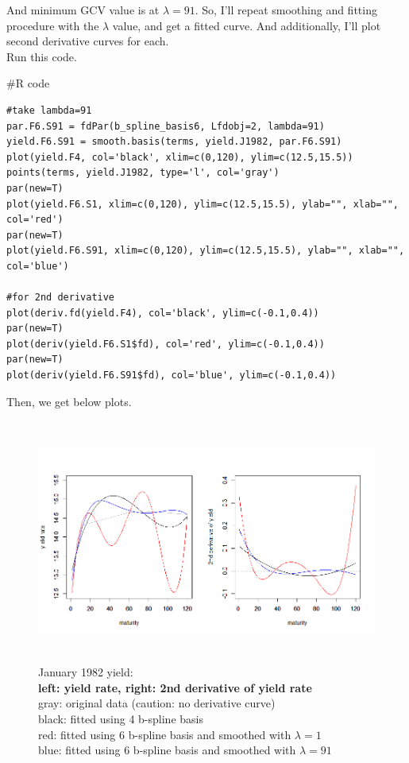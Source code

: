 \documentclass{article}
\newenvironment{Rcode}%
{%
    \begin{mdframed}
    \#R code
    \begin{small}
}
{%
    \end{small}
    \end{mdframed}
}
\begin{document}
And minimum GCV value is at $\lambda=91$. So, I'll repeat smoothing and fitting procedure with the $\lambda$ value,
and get a fitted curve. And additionally, I'll plot second derivative curves for each. \\Run this code.
\begin{Rcode}
    \begin{verbatim}
#take lambda=91
par.F6.S91 = fdPar(b_spline_basis6, Lfdobj=2, lambda=91)
yield.F6.S91 = smooth.basis(terms, yield.J1982, par.F6.S91)
plot(yield.F4, col='black', xlim=c(0,120), ylim=c(12.5,15.5))
points(terms, yield.J1982, type='l', col='gray')
par(new=T)
plot(yield.F6.S1, xlim=c(0,120), ylim=c(12.5,15.5), ylab="", xlab="", col='red')
par(new=T)
plot(yield.F6.S91, xlim=c(0,120), ylim=c(12.5,15.5), ylab="", xlab="", col='blue')

#for 2nd derivative
plot(deriv.fd(yield.F4), col='black', ylim=c(-0.1,0.4))
par(new=T)
plot(deriv(yield.F6.S1$fd), col='red', ylim=c(-0.1,0.4))
par(new=T)
plot(deriv(yield.F6.S91$fd), col='blue', ylim=c(-0.1,0.4))
    \end{verbatim}
\end{Rcode}

Then, we get below plots.

\begin{figure}[hh]
    \centering
    \includegraphics[height=8cm]{1982Jyield_comp_plot.png}
    \caption{January 1982 yield:\\
        \textbf{left: yield rate, right: 2nd derivative of yield rate}\\
        gray: original data (caution: no derivative curve)\\
        black: fitted using 4 b-spline basis\\
        red: fitted using 6 b-spline basis and smoothed with $\lambda=1$\\
        blue: fitted using 6 b-spline basis and smoothed with $\lambda=91$\\
        }
\end{figure}
\end{document}
